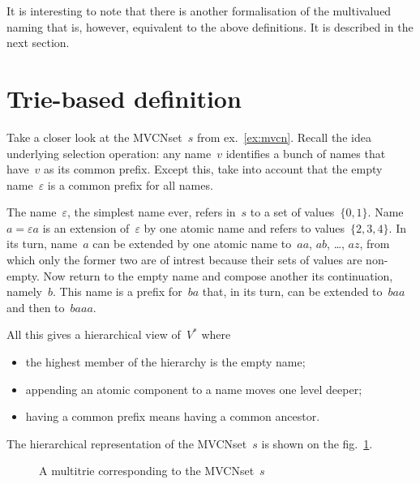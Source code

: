 \documentclass{article}
\theoremstyle{definition}
\begin{document}
It is interesting to note that there is another formalisation of the
multivalued naming that is, however, equivalent to the above definitions.  It
is described in the next section.



\section{Trie-based definition}

Take a closer look at the MVCNset~$s$ from ex.~\ref{ex:mvcn}.
Recall the
idea underlying selection operation: any name~$v$ identifies a bunch of
names that have~$v$ as its common prefix. Except this, take into account that
the empty name~$\varepsilon$ is a common prefix for all names.

The name~$\varepsilon$, the simplest name ever, refers in~$s$ to a set of
values~$\{0,1\}$. Name~$a=\varepsilon a$ is an extension of~$\varepsilon$ by
one atomic name and refers to values~$\{2,3,4\}$. In its turn, name~$a$ can
be extended by one atomic name to~$aa$, $ab$, \ldots, $az$, from which only the
former two are of intrest because their sets of values are non-empty.
Now return to the empty name and compose another its continuation, namely~$b$.
This name is a prefix for~$ba$ that, in its turn, can be extended to~$baa$ and
then to~$baaa$.

All this gives a hierarchical view of~$V^\ast$ where
\begin{itemize}
\item the highest member of the hierarchy is the empty name;
\item appending an atomic component to a name moves one level deeper;
\item having a common prefix means having a common ancestor.
\end{itemize}
The hierarchical representation of the MVCNset~$s$ is shown on the
fig.~\ref{fig:trie}.

\begin{figure}[ht]
\begin{center}
\begin{minipage}{17em}
\end{minipage}
\end{center}
\caption{A multitrie corresponding to the MVCNset~$s$}\label{fig:trie}
\end{figure}
\end{document}
